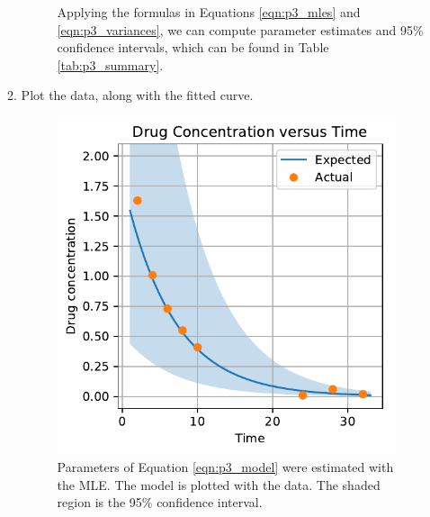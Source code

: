 \documentclass[letterpaper,11pt]{article}
\begin{document}
\begin{enumerate}
\begin{enumerate}
\begin{description}
      Applying the formulas in Equations \ref{eqn:p3_mles} and
      \ref{eqn:p3_variances}, we can compute parameter estimates and 95\%
      confidence intervals, which can be found in Table \ref{tab:p3_summary}.
    \end{description}    
  \item Plot the data, along with the fitted curve.
    \begin{figure}
      \centering
      \includegraphics{p3_fitted_curve.pdf}
      \caption{Parameters of Equation \ref{eqn:p3_model} were estimated with the
        MLE. The model is plotted with the data. The shaded region is the 95\%
        confidence interval.}
      \label{fig:p3_fitted}
    \end{figure}


\end{enumerate}
\end{enumerate}
\end{document}
